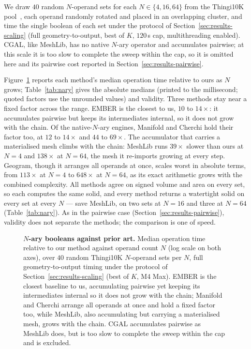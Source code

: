 \documentclass{egpubl}
\begin{document}
We draw $40$ random $N$-operand sets for each $N \in \{4, 16, 64\}$ from the Thingi10K pool~\cite{trueform2025}, each operand randomly rotated and placed in an overlapping cluster, and time the single boolean of each set under the protocol of Section~\ref{sec:results-scaling} (full geometry-to-output, best of $K$, $120$\,s cap, multithreading enabled). CGAL, like MeshLib, has no native $N$-ary operator and accumulates pairwise; at this scale it is too slow to complete the sweep within the cap, so it is omitted here and its pairwise cost reported in Section~\ref{sec:results-pairwise}.

Figure~\ref{fig:comparison-nary} reports each method's median operation time relative to ours as $N$ grows; Table~\ref{tab:nary} gives the absolute medians (printed to the millisecond; quoted factors use the unrounded values) and validity. Three methods stay near a fixed factor across the range. EMBER is the closest to us, $10$ to $14\times$: it accumulates pairwise but keeps its intermediates internal, so it does not grow with the chain. Of the native-$N$-ary engines, Manifold and Cherchi hold their factor too, at $12$ to $14\times$ and $44$ to $69\times$. The accumulator that carries a materialised mesh climbs with the chain: MeshLib runs $39\times$ slower than ours at $N{=}4$ and $138\times$ at $N{=}64$, the mesh it re-imports growing at every step. Geogram, though it arranges all operands at once, scales worst in absolute terms, from $113\times$ at $N{=}4$ to $648\times$ at $N{=}64$, as its exact arithmetic grows with the combined complexity. All methods agree on signed volume and area on every set, so each computes the same solid, and every method returns a watertight solid on every set at every $N$ --- save MeshLib, on two sets at $N{=}16$ and three at $N{=}64$ (Table~\ref{tab:nary}). As in the pairwise case (Section~\ref{sec:results-pairwise}), validity does not separate the methods; the comparison is one of speed.

\begin{figure}[t]
  \centering
  
  \caption{\textbf{$N$-ary booleans against prior art.} Median operation time relative to our method against operand count $N$ (log scale on both axes), over $40$ random Thingi10K $N$-operand sets per $N$, full geometry-to-output timing under the protocol of Section~\ref{sec:results-scaling} (best of $K$, M4 Max). EMBER is the closest baseline to us, accumulating pairwise yet keeping its intermediates internal so it does not grow with the chain; Manifold and Cherchi arrange all operands at once and hold a fixed factor too, while MeshLib, also accumulating but carrying a materialised mesh, grows with the chain. CGAL accumulates pairwise as MeshLib does, but is too slow to complete the sweep within the cap and is excluded.}
  \label{fig:comparison-nary}
\end{figure}
\end{document}
